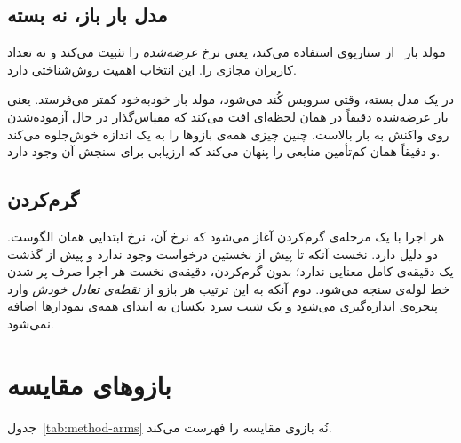 \subsection{مدل بار باز، نه بسته}
\label{sec:method-openmodel}

مولد بار~\cite{k6} از سناریوی  استفاده می‌کند، یعنی نرخ
\emph{عرضه‌شده} را تثبیت می‌کند و نه تعداد کاربران مجازی را. این انتخاب اهمیت روش‌شناختی دارد.

در یک مدل بسته، وقتی سرویس کُند می‌شود، مولد بار خودبه‌خود کمتر می‌فرستد. یعنی بار عرضه‌شده
دقیقاً در همان لحظه‌ای افت می‌کند که مقیاس‌گذار در حال آزموده‌شدن روی واکنش به بار بالاست.
چنین چیزی همه‌ی بازوها را به یک اندازه خوش‌جلوه می‌کند و دقیقاً همان کم‌تأمین منابعی را پنهان
می‌کند که ارزیابی برای سنجش آن وجود دارد.

\subsection{گرم‌کردن}
\label{sec:method-warmup}

هر اجرا با یک مرحله‌ی گرم‌کردن آغاز می‌شود که نرخ آن، نرخ ابتدایی همان الگوست. دو دلیل دارد.
نخست آنکه  تا پیش از نخستین درخواست وجود ندارد و
 پیش از گذشت یک دقیقه‌ی کامل معنایی ندارد؛ بدون گرم‌کردن، دقیقه‌ی نخست هر
اجرا صرف پر شدن خط لوله‌ی سنجه می‌شود. دوم آنکه به این ترتیب هر بازو از \emph{نقطه‌ی تعادل
خودش} وارد پنجره‌ی اندازه‌گیری می‌شود و یک شیب سرد یکسان به ابتدای همه‌ی نمودارها اضافه
نمی‌شود.

\section{بازوهای مقایسه}
\label{sec:method-arms}

جدول~\ref{tab:method-arms} نُه بازوی مقایسه را فهرست می‌کند.

